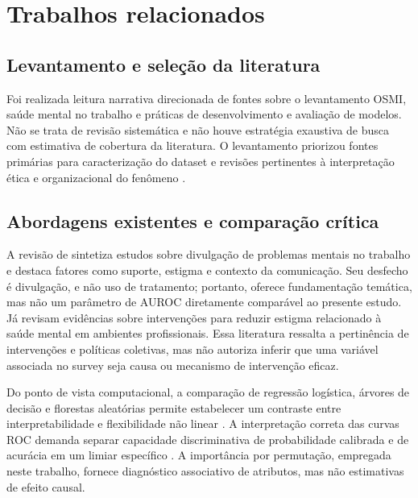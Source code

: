 \documentclass[11pt,a4paper]{article}
\begin{document}
\section{Trabalhos relacionados}\label{sec:relacionados}

\subsection{Levantamento e seleção da literatura}

Foi realizada leitura narrativa direcionada de fontes sobre o levantamento OSMI, saúde mental no trabalho e práticas de desenvolvimento e avaliação de modelos. Não se trata de revisão sistemática e não houve estratégia exaustiva de busca com estimativa de cobertura da literatura. O levantamento priorizou fontes primárias para caracterização do dataset e revisões pertinentes à interpretação ética e organizacional do fenômeno \cite{osmi2014,mcgrath2023disclosure,toth2023stigma}.

\subsection{Abordagens existentes e comparação crítica}

A revisão de  sintetiza estudos sobre divulgação de problemas mentais no trabalho e destaca fatores como suporte, estigma e contexto da comunicação. Seu desfecho é divulgação, e não uso de tratamento; portanto, oferece fundamentação temática, mas não um parâmetro de AUROC diretamente comparável ao presente estudo. Já  revisam evidências sobre intervenções para reduzir estigma relacionado à saúde mental em ambientes profissionais. Essa literatura ressalta a pertinência de intervenções e políticas coletivas, mas não autoriza inferir que uma variável associada no survey seja causa ou mecanismo de intervenção eficaz.

Do ponto de vista computacional, a comparação de regressão logística, árvores de decisão e florestas aleatórias permite estabelecer um contraste entre interpretabilidade e flexibilidade não linear \cite{pedregosa2011scikit,breiman2001rf}. A interpretação correta das curvas ROC demanda separar capacidade discriminativa de probabilidade calibrada e de acurácia em um limiar específico \cite{fawcett2006roc}. A importância por permutação, empregada neste trabalho, fornece diagnóstico associativo de atributos, mas não estimativas de efeito causal.
\end{document}
